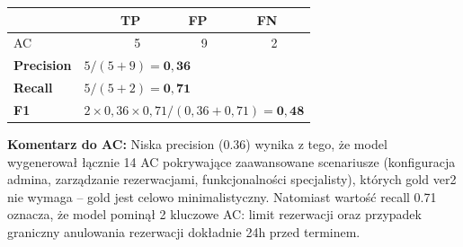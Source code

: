 \documentclass[12pt,a4paper]{article}
\begin{document}
\vspace{0.5em}
\begin{tabular}{lrrrr}
\toprule
& \textbf{TP} & \textbf{FP} & \textbf{FN} & \\
\midrule
AC & 5 & 9 & 2 & \\
\midrule
\textbf{Precision} & \multicolumn{4}{l}{$5 / (5+9) = \mathbf{0{,}36}$} \\
\textbf{Recall}    & \multicolumn{4}{l}{$5 / (5+2) = \mathbf{0{,}71}$} \\
\textbf{F1}        & \multicolumn{4}{l}{$2 \times 0{,}36 \times 0{,}71 / (0{,}36+0{,}71) = \mathbf{0{,}48}$} \\
\bottomrule
\end{tabular}

\vspace{0.5em}
\begin{mdframed}[backgroundcolor=metabg, linewidth=0pt, innerleftmargin=10pt, innerrightmargin=10pt, innertopmargin=6pt, innerbottommargin=6pt]
\small\textbf{Komentarz do AC:} Niska precision (0.36) wynika z tego, że model wygenerował łącznie 14 AC pokrywające zaawansowane scenariusze (konfiguracja admina, zarządzanie rezerwacjami, funkcjonalności specjalisty), których gold ver2 nie wymaga -- gold jest celowo minimalistyczny. Natomiast wartość recall 0.71 oznacza, że model pominął 2 kluczowe AC: limit rezerwacji oraz przypadek graniczny anulowania rezerwacji dokładnie 24h przed terminem.
\end{mdframed}
\newpage
\end{document}
